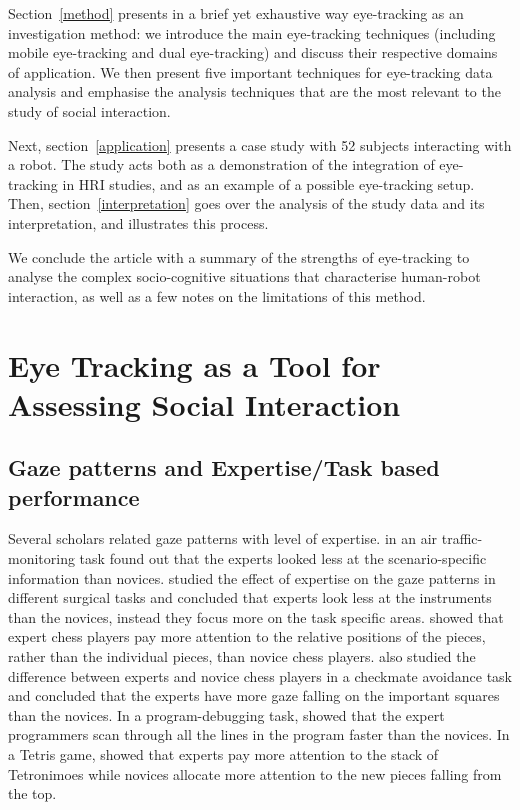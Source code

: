 \documentclass{sig-alternate}
\begin{document}
Section~\ref{method} presents in a brief yet exhaustive way eye-tracking as an
investigation method: we introduce the main eye-tracking techniques (including
mobile eye-tracking and dual eye-tracking) and discuss their respective domains
of application. We then present five important techniques for eye-tracking data
analysis and emphasise the analysis techniques that are the most relevant to the
study of social interaction.

Next, section~\ref{application} presents a case study with 52 subjects
interacting with a robot. The study acts both as a demonstration of the
integration of eye-tracking in HRI studies, and as an example of a possible
eye-tracking setup. Then, section~\ref{interpretation} goes over the analysis of
the study data and its interpretation, and illustrates this process.

We conclude the article with a summary of the strengths of eye-tracking to
analyse the complex socio-cognitive situations that characterise human-robot
interaction, as well as a few notes on the limitations of this method.


\section{Eye Tracking as a Tool for Assessing Social Interaction}
\label{et_assessing}

\subsection{Gaze patterns and Expertise/Task based performance}

Several scholars related gaze patterns with level of expertise.
\cite{hasse2012measure} in an air traffic-monitoring task found out that the
experts looked less at the scenario-specific information than novices.
\cite{eivazi2012gaze, law2004eye, tien2010measuring} studied the effect of
expertise on the gaze patterns in different surgical tasks and concluded that
experts look less at the instruments than the novices, instead they focus more
on the task specific areas. \cite{reingold2001visual} showed that expert chess
players pay more attention to the relative positions of the pieces, rather than
the individual pieces, than novice chess players. \cite{blignaut2008visual} also
studied the difference between experts and novice chess players in a checkmate
avoidance task and concluded that the experts have more gaze falling on the
important squares than the novices. In a program-debugging task,
\cite{sharif2012eye} showed that the expert programmers scan through all the
lines in the program faster than the novices. In a Tetris game,
\cite{jermann2010using} showed that experts pay more attention to the stack of
Tetronimoes while novices allocate more attention to the new pieces falling from
the top.
\end{document}
